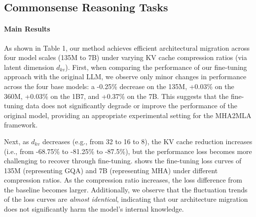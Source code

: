 \subsection{Commonsense Reasoning Tasks}  
\label{ssec:general_res}

\paragraph{Main Results}

As shown in Table 1, our method achieves efficient architectural migration across four model scales (135M to 7B) under varying KV cache compression ratios (via latent dimension \( d_{kv} \)). 
First, when comparing the performance of our fine-tuning approach with the original LLM, we observe only minor changes in performance across the four base models: a -0.25\% decrease on the 135M, +0.03\% on the 360M, +0.03\% on the 1B7, and +0.37\% on the 7B. 
This suggests that the fine-tuning data does not significantly degrade or improve the performance of the original model, providing an appropriate experimental setting for the MHA2MLA framework.


Next, as \(d_{kv}\) decreases (e.g., from 32 to 16 to 8), the KV cache reduction increases (i.e., from -68.75\% to -81.25\% to -87.5\%), but the performance loss becomes more challenging to recover through fine-tuning. 
 shows the fine-tuning loss curves of 135M (representing GQA) and 7B (representing MHA) under different compression ratios. As the compression ratio increases, the loss difference from the baseline becomes larger. Additionally, we observe that the fluctuation trends of the loss curves are \textit{almost identical}, indicating that our architecture migration does not significantly harm the model's internal knowledge.

